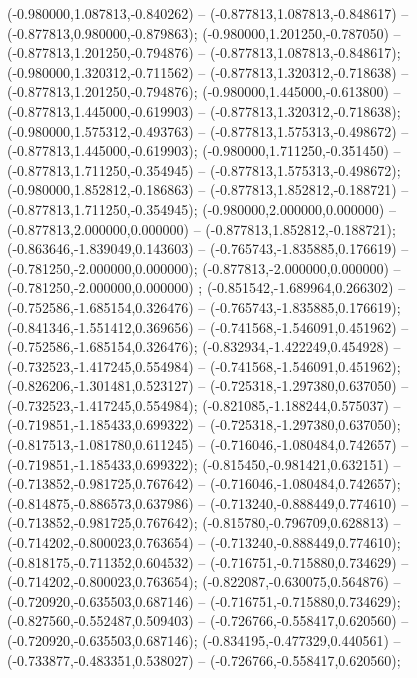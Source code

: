  (-0.980000,1.087813,-0.840262) -- (-0.877813,1.087813,-0.848617) -- (-0.877813,0.980000,-0.879863);
 (-0.980000,1.201250,-0.787050) -- (-0.877813,1.201250,-0.794876) -- (-0.877813,1.087813,-0.848617);
 (-0.980000,1.320312,-0.711562) -- (-0.877813,1.320312,-0.718638) -- (-0.877813,1.201250,-0.794876);
 (-0.980000,1.445000,-0.613800) -- (-0.877813,1.445000,-0.619903) -- (-0.877813,1.320312,-0.718638);
 (-0.980000,1.575312,-0.493763) -- (-0.877813,1.575313,-0.498672) -- (-0.877813,1.445000,-0.619903);
 (-0.980000,1.711250,-0.351450) -- (-0.877813,1.711250,-0.354945) -- (-0.877813,1.575313,-0.498672);
 (-0.980000,1.852812,-0.186863) -- (-0.877813,1.852812,-0.188721) -- (-0.877813,1.711250,-0.354945);
 (-0.980000,2.000000,0.000000) -- (-0.877813,2.000000,0.000000) -- (-0.877813,1.852812,-0.188721);
 (-0.863646,-1.839049,0.143603) -- (-0.765743,-1.835885,0.176619) -- (-0.781250,-2.000000,0.000000);
 (-0.877813,-2.000000,0.000000) -- (-0.781250,-2.000000,0.000000) ;
 (-0.851542,-1.689964,0.266302) -- (-0.752586,-1.685154,0.326476) -- (-0.765743,-1.835885,0.176619);
 (-0.841346,-1.551412,0.369656) -- (-0.741568,-1.546091,0.451962) -- (-0.752586,-1.685154,0.326476);
 (-0.832934,-1.422249,0.454928) -- (-0.732523,-1.417245,0.554984) -- (-0.741568,-1.546091,0.451962);
 (-0.826206,-1.301481,0.523127) -- (-0.725318,-1.297380,0.637050) -- (-0.732523,-1.417245,0.554984);
 (-0.821085,-1.188244,0.575037) -- (-0.719851,-1.185433,0.699322) -- (-0.725318,-1.297380,0.637050);
 (-0.817513,-1.081780,0.611245) -- (-0.716046,-1.080484,0.742657) -- (-0.719851,-1.185433,0.699322);
 (-0.815450,-0.981421,0.632151) -- (-0.713852,-0.981725,0.767642) -- (-0.716046,-1.080484,0.742657);
 (-0.814875,-0.886573,0.637986) -- (-0.713240,-0.888449,0.774610) -- (-0.713852,-0.981725,0.767642);
 (-0.815780,-0.796709,0.628813) -- (-0.714202,-0.800023,0.763654) -- (-0.713240,-0.888449,0.774610);
 (-0.818175,-0.711352,0.604532) -- (-0.716751,-0.715880,0.734629) -- (-0.714202,-0.800023,0.763654);
 (-0.822087,-0.630075,0.564876) -- (-0.720920,-0.635503,0.687146) -- (-0.716751,-0.715880,0.734629);
 (-0.827560,-0.552487,0.509403) -- (-0.726766,-0.558417,0.620560) -- (-0.720920,-0.635503,0.687146);
 (-0.834195,-0.477329,0.440561) -- (-0.733877,-0.483351,0.538027) -- (-0.726766,-0.558417,0.620560);
